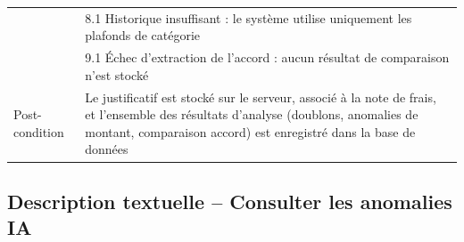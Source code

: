 \documentclass[12pt,a4paper]{report}
\begin{document}
\begin{longtable}{|p{3cm}|p{11cm}|}
& 8.1 Historique insuffisant : le système utilise uniquement les plafonds de catégorie \\

& 9.1 Échec d'extraction de l'accord : aucun résultat de comparaison n'est stocké \\

\hline

Post-condition & Le justificatif est stocké sur le serveur, associé à la note de frais, et l'ensemble des résultats d'analyse (doublons, anomalies de montant, comparaison accord) est enregistré dans la base de données \\

\hline

\end{longtable}



\subsection*{Description textuelle -- Consulter les anomalies IA}


\label{tab:gerer_anomalies_desc}
\end{document}
